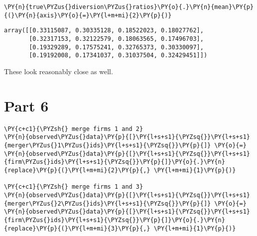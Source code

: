     \begin{tcolorbox}[breakable, size=fbox, boxrule=1pt, pad at break*=1mm,colback=cellbackground, colframe=cellborder]
\begin{Verbatim}[commandchars=\\\{\}]
\PY{n}{true\PYZus{}diversion\PYZus{}ratios}\PY{o}{.}\PY{n}{mean}\PY{p}{(}\PY{n}{axis}\PY{o}{=}\PY{l+m+mi}{2}\PY{p}{)}
\end{Verbatim}
\end{tcolorbox}

            \begin{tcolorbox}[breakable, size=fbox, boxrule=.5pt, pad at break*=1mm, opacityfill=0]
\begin{Verbatim}[commandchars=\\\{\}]
array([[0.33115087, 0.30335128, 0.18522023, 0.18027762],
       [0.32317153, 0.32122579, 0.18063565, 0.17496703],
       [0.19329289, 0.17575241, 0.32765373, 0.30330097],
       [0.19192008, 0.17341037, 0.31037504, 0.32429451]])
\end{Verbatim}
\end{tcolorbox}

    These look reasonably close as well.

    \hypertarget{part-6}{%
\section{Part 6}\label{part-6}}

    \begin{tcolorbox}[breakable, size=fbox, boxrule=1pt, pad at break*=1mm,colback=cellbackground, colframe=cellborder]
\begin{Verbatim}[commandchars=\\\{\}]
\PY{c+c1}{\PYZsh{} merge firms 1 and 2}
\PY{n}{observed\PYZus{}data}\PY{p}{[}\PY{l+s+s1}{\PYZsq{}}\PY{l+s+s1}{merger\PYZus{}1\PYZus{}ids}\PY{l+s+s1}{\PYZsq{}}\PY{p}{]} \PY{o}{=} \PY{n}{observed\PYZus{}data}\PY{p}{[}\PY{l+s+s1}{\PYZsq{}}\PY{l+s+s1}{firm\PYZus{}ids}\PY{l+s+s1}{\PYZsq{}}\PY{p}{]}\PY{o}{.}\PY{n}{replace}\PY{p}{(}\PY{l+m+mi}{2}\PY{p}{,} \PY{l+m+mi}{1}\PY{p}{)}

\PY{c+c1}{\PYZsh{} merge firms 1 and 3}
\PY{n}{observed\PYZus{}data}\PY{p}{[}\PY{l+s+s1}{\PYZsq{}}\PY{l+s+s1}{merger\PYZus{}2\PYZus{}ids}\PY{l+s+s1}{\PYZsq{}}\PY{p}{]} \PY{o}{=} \PY{n}{observed\PYZus{}data}\PY{p}{[}\PY{l+s+s1}{\PYZsq{}}\PY{l+s+s1}{firm\PYZus{}ids}\PY{l+s+s1}{\PYZsq{}}\PY{p}{]}\PY{o}{.}\PY{n}{replace}\PY{p}{(}\PY{l+m+mi}{3}\PY{p}{,} \PY{l+m+mi}{1}\PY{p}{)}
\end{Verbatim}
\end{tcolorbox}

